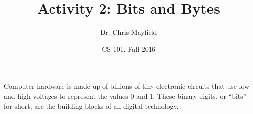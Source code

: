 \documentclass[12pt]{article}
\title{Activity 2: Bits and Bytes}
\author{Dr. Chris Mayfield}
\date{CS 101, Fall 2016}
\begin{document}
\maketitle

Computer hardware is made up of billions of tiny electronic circuits that use low and high voltages to represent the values 0 and 1.
These binary digits, or ``bits'' for short, are the building blocks of all digital technology.



\end{document}
